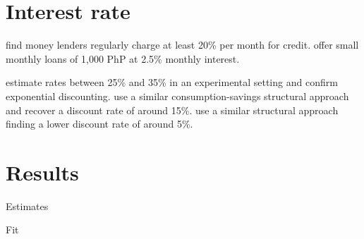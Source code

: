 \documentclass[12pt]{article}
\begin{document}
\section{Interest rate}



\cite{karlan2009expanding} find money lenders regularly charge at least 20\% per month for credit.  \cite{gine2014group} offer small monthly loans of 1,000 PhP at 2.5\% monthly interest.

\cite{andreoni2012estimating} estimate rates between 25\% and 35\% in an experimental setting and confirm exponential discounting.  \cite{laibson2007estimating} use a similar consumption-savings structural approach and recover a discount rate of around 15\%.  \cite{gourinchas2002consumption} use a similar structural approach finding a lower discount rate of around 5\%.






\section{Results}

\begin{table}
\centering
\caption{Estimates}\label{table:estimates}

\end{table}

\begin{table}
\centering
\caption{Fit}\label{table:fit}

\end{table}





\nocite{*}
\singlespacing
\setlength{\bibsep}{7pt}


\end{document}
